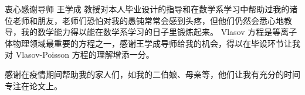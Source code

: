 \begin{acknowledgement}
  衷心感谢导师 王学成 教授对本人毕业设计的指导和在数学系学习中帮助过我的诸位老师和朋友，老师们恐怕对我的愚钝常常会感到头疼，但他们仍然会悉心地教导，我的数学能力得以能在数学系学习的日子里锻炼起来。 Vlasov 方程是等离子体物理领域最重要的方程之一，感谢王学成导师给我的机会，得以在毕设环节让我对 Vlasov-Poisson 方程的理解增添一分。

  感谢在疫情期间帮助我的家人们，如我的二伯娘、母亲等，他们让我有充分的时间专注在论文上。


\end{acknowledgement}
